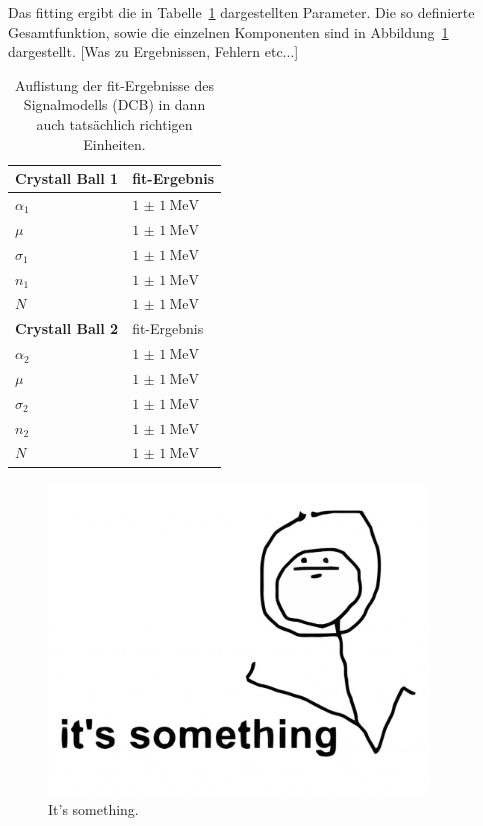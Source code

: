 Das fitting ergibt die in Tabelle~\ref{tab:fit2} dargestellten Parameter. Die so definierte Gesamtfunktion, sowie die einzelnen Komponenten sind in Abbildung~\ref{fig:fit2} dargestellt. [Was zu Ergebnissen, Fehlern etc...]
%
\begin{table}[H]
  \centering
  \caption{Auflistung der fit-Ergebnisse des Signalmodells (DCB) in dann auch tatsächlich richtigen Einheiten.}
  \begin{tabular}{ll}
    \toprule
    \textbf{Crystall Ball 1}      &  fit-Ergebnis \\
    \midrule
    \quad$\alpha_1$               & $\SI{1(1)}{\mega\electronvolt}$ \\
    \quad$\mu$                    & $\SI{1(1)}{\mega\electronvolt}$ \\
    \quad$\sigma_1$               & $\SI{1(1)}{\mega\electronvolt}$ \\
    \quad$n_1$                    & $\SI{1(1)}{\mega\electronvolt}$ \\
    \quad$N$                      & $\SI{1(1)}{\mega\electronvolt}$ \\
    \midrule
    \textbf{Crystall Ball 2}      &  fit-Ergebnis \\
    \midrule
    \quad$\alpha_2$               & $\SI{1(1)}{\mega\electronvolt}$ \\
    \quad$\mu$                    & $\SI{1(1)}{\mega\electronvolt}$ \\
    \quad$\sigma_2$               & $\SI{1(1)}{\mega\electronvolt}$ \\
    \quad$n_2$                    & $\SI{1(1)}{\mega\electronvolt}$ \\
    \quad$N$                      & $\SI{1(1)}{\mega\electronvolt}$ \\
    \bottomrule
  \end{tabular}
  \label{tab:fit2}
\end{table}
%
\begin{figure}[H]
  \centering
      \includegraphics[width=0.9\textwidth]{Plots/something.png}
  \caption{It's something.}
  \label{fig:fit2}
\end{figure}
%
